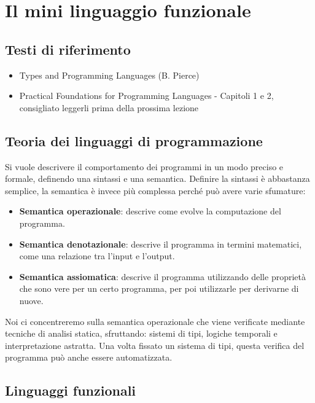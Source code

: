 

\chapter{Il mini linguaggio funzionale}

\section*{Testi di riferimento}

\begin{itemize}
	\item Types and Programming Languages (B. Pierce) 
	\item Practical Foundations for Programming Languages - Capitoli 1 e 2, consigliato leggerli prima della prossima lezione
\end{itemize}

\section{Teoria dei linguaggi di programmazione}

Si vuole descrivere il comportamento dei programmi in un modo preciso e formale, definendo una sintassi e una semantica.
Definire la sintassi è abbastanza semplice, la semantica è invece più complessa perché può avere varie sfumature:

\begin{itemize}
	\item \textbf{Semantica operazionale}: descrive come evolve la computazione del programma.
	\item \textbf{Semantica denotazionale}: descrive il programma in termini matematici, come una relazione tra l'input e l'output.
	\item \textbf{Semantica assiomatica}: descrive il programma utilizzando delle proprietà che sono vere per un certo programma, per poi utilizzarle per derivarne di nuove.
\end{itemize}

Noi ci concentreremo sulla semantica operazionale che viene verificate mediante tecniche di analisi statica, sfruttando: sistemi di tipi, logiche temporali e interpretazione astratta.
Una volta fissato un sistema di tipi, questa verifica del programma può anche essere automatizzata.

\section{Linguaggi funzionali}

